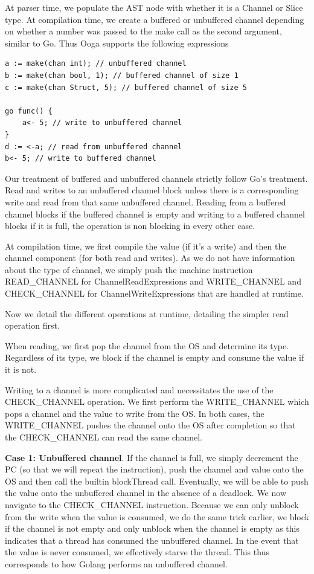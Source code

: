 \documentclass{report}
\begin{document}
At parser time, we populate the AST node with whether it is a Channel or Slice type. At compilation time, we create a buffered or unbuffered channel depending on whether a number was passed to the make call as the second argument, similar to Go. Thus Ooga supports the following expressions

\begin{verbatim}
a := make(chan int); // unbuffered channel
b := make(chan bool, 1); // buffered channel of size 1
c := make(chan Struct, 5); // buffered channel of size 5

go func() {
    a<- 5; // write to unbuffered channel
}
d := <-a; // read from unbuffered channel
b<- 5; // write to buffered channel
\end{verbatim}

Our treatment of buffered and unbuffered channels strictly follow Go's treatment. Read and writes to an unbuffered channel block unless there is a corresponding write and read from that same unbuffered channel. Reading from a buffered channel blocks if the buffered channel is empty and writing to a buffered channel blocks if it is full, the operation is non blocking in every other case. 

At compilation time, we first compile the value (if it's a write) and then the channel component (for both read and writes). As we do not have information about the type of channel, we simply push the machine instruction READ\_CHANNEL for ChannelReadExpressions and WRITE\_CHANNEL and CHECK\_CHANNEL for ChannelWriteExpressions that are handled at runtime.

Now we detail the different operations at runtime, detailing the simpler read operation first. 

When reading, we first pop the channel from the OS and determine its type. Regardless of its type, we block if the channel is empty and consume the value if it is not.

Writing to a channel is more complicated and necessitates the use of the CHECK\_CHANNEL operation. We first perform the WRITE\_CHANNEL which pops a channel and the value to write from the OS. In both cases, the WRITE\_CHANNEL pushes the channel onto the OS after completion so that the CHECK\_CHANNEL can read the same channel.

\textbf{Case 1: Unbuffered channel}. If the channel is full, we simply decrement the PC (so that we will repeat the instruction), push the channel and value onto the OS and then call the builtin blockThread call. Eventually, we will be able to push the value onto the unbuffered channel in the absence of a deadlock. We now navigate to the CHECK\_CHANNEL instruction. Because we can only unblock from the write when the value is consumed, we do the same trick earlier, we block if the channel is not empty and only unblock when the channel is empty as this indicates that a thread has consumed the unbuffered channel. In the event that the value is never consumed, we effectively starve the thread. This thus corresponds to how Golang performs an unbuffered channel.
\end{document}
